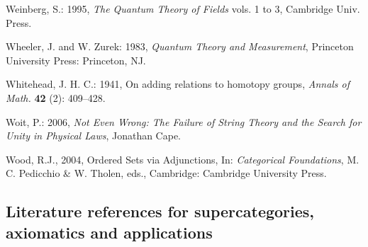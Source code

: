 \documentclass[12pt]{article}
\theoremstyle{plain}
\theoremstyle{definition}
\numberwithin{equation}{section}
\begin{document}
\begin{thebibliography}{99}
Weinberg, S.: 1995, \emph{The Quantum Theory of Fields}  vols. 1 to 3, Cambridge Univ. Press.

Wheeler, J. and W. Zurek: 1983, \emph{Quantum Theory and Measurement}, Princeton University Press: Princeton, NJ.

Whitehead, J. H. C.: 1941, On adding relations to homotopy groups, \emph{Annals of Math.} \textbf{42} (2): 409--428.

Woit, P.: 2006, \emph{Not Even Wrong: The Failure of String Theory and the Search for Unity in Physical Laws}, Jonathan Cape.

Wood, R.J., 2004, Ordered Sets via Adjunctions, In: \emph{Categorical Foundations}, M. C. Pedicchio \& W. Tholen, eds., Cambridge: Cambridge University Press. 

\end{thebibliography}

\subsection{Literature references for supercategories, axiomatics and applications}
\end{document}
